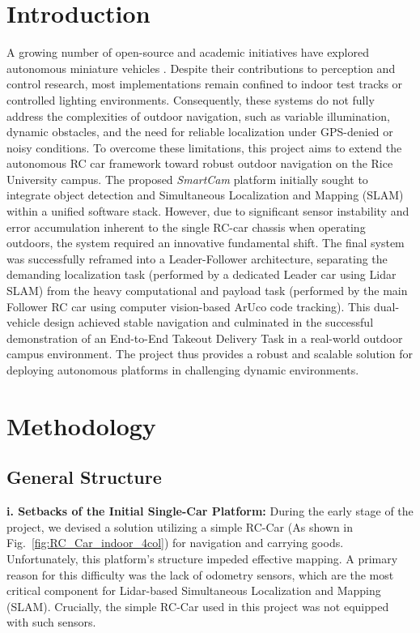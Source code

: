 \documentclass[journal,transmag]{IEEEtran}
\begin{document}
\section{Introduction}
A growing number of open-source and academic initiatives have explored autonomous miniature vehicles \cite{cairo_rc, donkeycar, f1tenth, mit_racecar}. Despite their contributions to perception and control research, most implementations remain confined to indoor test tracks or controlled lighting environments. Consequently, these systems do not fully address the complexities of outdoor navigation, such as variable illumination, dynamic obstacles, and the need for reliable localization under GPS-denied or noisy conditions. To overcome these limitations, this project aims to extend the autonomous RC car framework toward robust outdoor navigation on the Rice University campus. The proposed \textit{SmartCam} platform initially sought to integrate object detection and Simultaneous Localization and Mapping (SLAM) within a unified software stack. However, due to significant sensor instability and error accumulation inherent to the single RC-car chassis when operating outdoors, the system required an innovative fundamental shift. The final system was successfully reframed into a Leader-Follower architecture, separating the demanding localization task (performed by a dedicated Leader car using Lidar SLAM) from the heavy computational and payload task (performed by the main Follower RC car using computer vision-based ArUco code tracking). This dual-vehicle design achieved stable navigation and culminated in the successful demonstration of an End-to-End Takeout Delivery Task in a real-world outdoor campus environment. The project thus provides a robust and scalable solution for deploying autonomous platforms in challenging dynamic environments.

\section{Methodology}

\subsection{General Structure}

\textbf{i. Setbacks of the Initial Single-Car Platform:} During the early stage of the project, we devised a solution utilizing a simple RC-Car (As shown in Fig.~\ref{fig:RC_Car_indoor_4col}) for navigation and carrying goods. Unfortunately, this platform's structure impeded effective mapping. A primary reason for this difficulty was the lack of odometry sensors, which are the most critical component for Lidar-based Simultaneous Localization and Mapping (SLAM). Crucially, the simple RC-Car used in this project was not equipped with such sensors.
\end{document}
